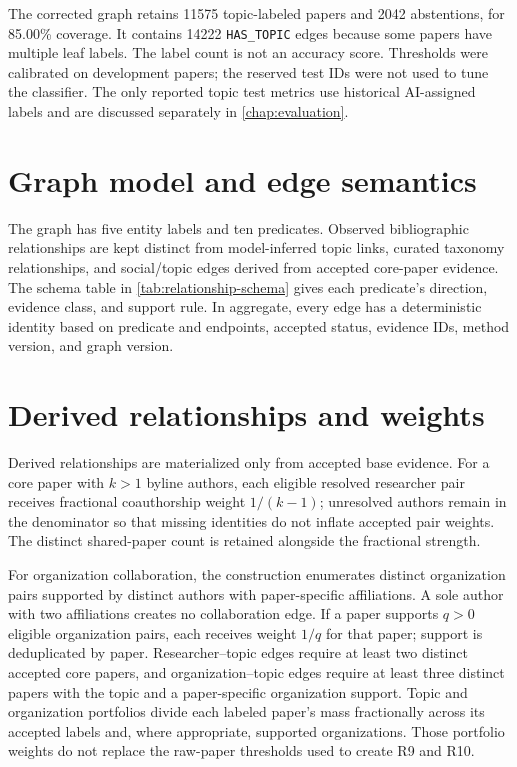 The corrected graph retains \num{11575} topic-labeled papers and \num{2042}
abstentions, for 85.00\% coverage. It contains \num{14222} \texttt{HAS\_TOPIC} edges
because some papers have multiple leaf labels. The label count is not an
accuracy score. Thresholds were calibrated on development papers; the reserved
test IDs were not used to tune the classifier. The only reported topic test
metrics use historical AI-assigned labels and are discussed separately in
\cref{chap:evaluation}.

\section{Graph model and edge semantics}

The graph has five entity labels and ten predicates. Observed bibliographic
relationships are kept distinct from model-inferred topic links, curated
taxonomy relationships, and social/topic edges derived from accepted core-paper
evidence. The schema table in \cref{tab:relationship-schema} gives each
predicate's direction, evidence class, and support rule. In aggregate, every
edge has a deterministic identity based on predicate and endpoints, accepted
status, evidence IDs, method version, and graph version.


\FloatBarrier


\section{Derived relationships and weights}

Derived relationships are materialized only from accepted base evidence. For a
core paper with $k>1$ byline authors, each eligible resolved researcher pair
receives fractional coauthorship weight $1/(k-1)$; unresolved authors remain in
the denominator so that missing identities do not inflate accepted pair weights.
The distinct shared-paper count is retained alongside the fractional strength.

For organization collaboration, the construction enumerates distinct
organization pairs supported by distinct authors with paper-specific
affiliations. A sole author with two affiliations creates no collaboration edge.
If a paper supports $q>0$ eligible organization pairs, each receives weight
$1/q$ for that paper; support is deduplicated by paper. Researcher--topic edges
require at least two distinct accepted core papers, and organization--topic edges
require at least three distinct papers with the topic and a paper-specific
organization support. Topic and organization portfolios divide each labeled
paper's mass fractionally across its accepted labels and, where appropriate,
supported organizations. Those portfolio weights do not replace the raw-paper
thresholds used to create R9 and R10.

